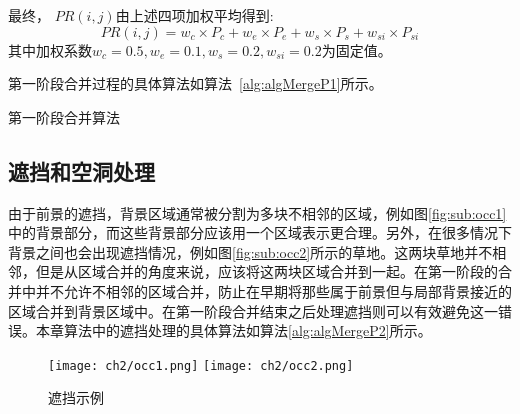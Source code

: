 最终， $PR(i,j)$由上述四项加权平均得到:
\begin{equation}
   \label{equ:chap2:PR}
   PR(i,j)=w_{c}\times P_{c}+w_{e} \times P_{e} + w_{s} \times P_{s} + w_{si} \times P_{si}
\end{equation}
其中加权系数$w_c=0.5, w_e=0.1, w_s=0.2, w_{si}=0.2$为固定值。\par

第一阶段合并过程的具体算法如算法~\ref{alg:algMergeP1}所示。



\renewcommand{\algorithmcfname}{算法}
\begin{algorithm}[htb]
\LinesNumbered
{}
\caption{第一阶段合并算法}
\label{alg:algMergeP1}

\end{algorithm}

\subsection{遮挡和空洞处理}
\label{subsec:mergeP2}

由于前景的遮挡，背景区域通常被分割为多块不相邻的区域，例如图\ref{fig:sub:occ1}中的背景部分，而这些背景部分应该用一个区域表示更合理。另外，在很多情况下背景之间也会出现遮挡情况，例如图\ref{fig:sub:occ2}所示的草地。这两块草地并不相邻，但是从区域合并的角度来说，应该将这两块区域合并到一起。在第一阶段的合并中并不允许不相邻的区域合并，防止在早期将那些属于前景但与局部背景接近的区域合并到背景区域中。在第一阶段合并结束之后处理遮挡则可以有效避免这一错误。本章算法中的遮挡处理的具体算法如算法\ref{alg:algMergeP2}所示。
\begin{figure}[htb]
  \centering%
    {\texttt{[image: ch2/occ1.png]}}%
 \hspace{1em}%
      {\texttt{[image: ch2/occ2.png]}}

  \caption{遮挡示例}
  \label{fig:occ}
\end{figure}

